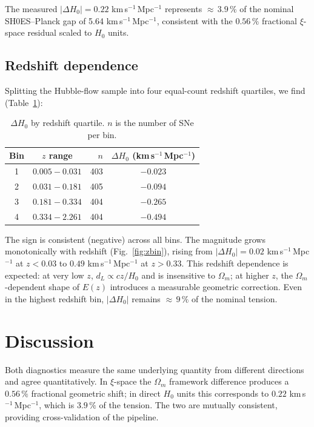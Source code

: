 \documentclass[usenatbib]{mnras}
\begin{document}
The measured $|\Delta H_0| = 0.22$ km\,s$^{-1}$\,Mpc$^{-1}$
represents ${\approx}\,3.9\,\%$ of the nominal SH0ES--Planck gap
of 5.64 km\,s$^{-1}$\,Mpc$^{-1}$, consistent with the $0.56\,\%$
fractional $\xi$-space residual scaled to $H_0$ units.

\subsection{Redshift dependence}
\label{sec:results_zbin}

Splitting the Hubble-flow sample into four equal-count redshift quartiles,
we find (Table~\ref{tab:zbins}):

\begin{table}
  \caption{$\Delta H_0$ by redshift quartile. $n$ is the number of SNe per bin.}
  \label{tab:zbins}
  \begin{tabular}{ccrc}
    \toprule
    Bin & $z$ range & $n$ & $\Delta H_0$ (km\,s$^{-1}$\,Mpc$^{-1}$) \\
    \midrule
    1 & $0.005 - 0.031$ & 403 & $-0.023$ \\
    2 & $0.031 - 0.181$ & 405 & $-0.094$ \\
    3 & $0.181 - 0.334$ & 404 & $-0.265$ \\
    4 & $0.334 - 2.261$ & 404 & $-0.494$ \\
    \bottomrule
  \end{tabular}
\end{table}

The sign is consistent (negative) across all bins.
The magnitude grows monotonically with redshift
(Fig.~\ref{fig:zbin}), rising from
$|\Delta H_0| = 0.02$ km\,s$^{-1}$\,Mpc$^{-1}$ at $z < 0.03$
to $0.49$ km\,s$^{-1}$\,Mpc$^{-1}$ at $z > 0.33$.
This redshift dependence is expected:
at very low $z$, $d_L \propto cz/H_0$ and is insensitive to $\Omega_m$;
at higher $z$, the $\Omega_m$-dependent shape of $E(z)$ introduces
a measurable geometric correction.
Even in the highest redshift bin, $|\Delta H_0|$ remains
${\approx}\,9\,\%$ of the nominal tension.

\section{Discussion}
\label{sec:discuss}

Both diagnostics measure the same underlying quantity from different
directions and agree quantitatively.
In $\xi$-space the $\Omega_m$ framework difference produces a $0.56\,\%$
fractional geometric shift; in direct $H_0$ units this corresponds to
$0.22$ km\,s$^{-1}$\,Mpc$^{-1}$, which is $3.9\,\%$ of the tension.
The two are mutually consistent, providing cross-validation of the pipeline.
\end{document}
